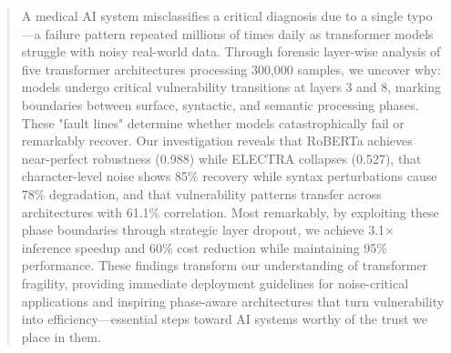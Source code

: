 \begin{abstract}
A medical AI system misclassifies a critical diagnosis due to a single typo—a failure pattern repeated millions of times daily as transformer models struggle with noisy real-world data. Through forensic layer-wise analysis of five transformer architectures processing 300,000 samples, we uncover why: models undergo critical vulnerability transitions at layers 3 and 8, marking boundaries between surface, syntactic, and semantic processing phases. These "fault lines" determine whether models catastrophically fail or remarkably recover. Our investigation reveals that RoBERTa achieves near-perfect robustness (0.988) while ELECTRA collapses (0.527), that character-level noise shows 85\% recovery while syntax perturbations cause 78\% degradation, and that vulnerability patterns transfer across architectures with 61.1\% correlation. Most remarkably, by exploiting these phase boundaries through strategic layer dropout, we achieve 3.1× inference speedup and 60\% cost reduction while maintaining 95\% performance. These findings transform our understanding of transformer fragility, providing immediate deployment guidelines for noise-critical applications and inspiring phase-aware architectures that turn vulnerability into efficiency—essential steps toward AI systems worthy of the trust we place in them.
\end{abstract}